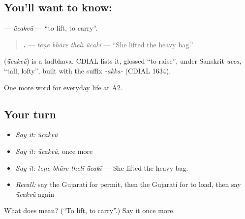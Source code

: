 \subsection*{You'll want to know: }
\textbf{} — \emph{ū̃cakvũ} — \textquotedblleft{}to lift, to carry\textquotedblright{}.

\begin{quote}
\textbf{   .} — \emph{teṇe bhāre thelī ū̃cakī} — \textquotedblleft{}She lifted the heavy bag.\textquotedblright{}
\end{quote}

\begin{cousinweb}
\textbf{} (\emph{ū̃cakvũ}) is a tadbhava. CDIAL lists it, glossed \textquotedblleft{}to raise\textquotedblright{}, under Sanskrit \emph{ucca}, \textquotedblleft{}tall, lofty\textquotedblright{}, built with the suffix \emph{-akka-} (CDIAL 1634).
\end{cousinweb}

\begin{grammarlens}[title={What you've built}]
One more word for everyday life at A2.
\end{grammarlens}

\subsection*{Your turn}
\begin{itemize}
\raggedright
  \item \emph{Say it:} \emph{ū̃cakvũ}
  \item \emph{Say it:} \emph{ū̃cakvũ}, once more
  \item \emph{Say it:} \emph{teṇe bhāre thelī ū̃cakī} — She lifted the heavy bag.
  \item \emph{Recall:} say the Gujarati for permit, then the Gujarati for to load, then say \emph{ū̃cakvũ} again
\end{itemize}

\begin{tcolorbox}[breakable,colback=teal!4,colframe=teal!35!black,title={Before you move on}]
What does  mean? (\textquotedblleft{}To lift, to carry\textquotedblright{}.) Say it once more.
\end{tcolorbox}

